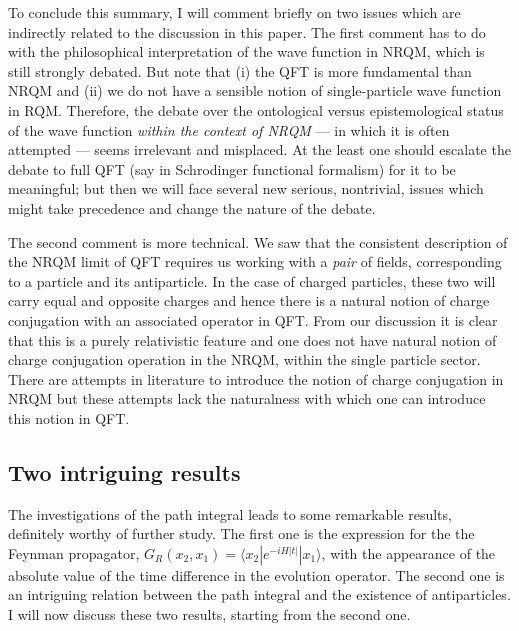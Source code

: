 \documentclass{article}
\def\bk#1#2#3{{\langle #1|#2|#3\rangle}}  %
\begin{document}
To conclude this summary, I will comment briefly on two issues which are indirectly related to the discussion in this paper. The first comment  has to do with the  philosophical interpretation of  the  wave function in NRQM, which is still strongly debated. But note that (i)
 the QFT is more fundamental than NRQM and (ii) we do not have a sensible notion of single-particle wave function in RQM. Therefore, the debate over the ontological versus epistemological
status of the wave function \textit{within the context of NRQM} --- in which it is often attempted ---
seems irrelevant and misplaced. At the least one should escalate the debate to full QFT (say in Schrodinger functional formalism) for it to be meaningful; but then we will face several new serious, nontrivial, issues which might take precedence and change the nature of the debate.

The second comment is more technical. We saw that the consistent description of the NRQM limit of QFT requires us working with a \textit{pair} of fields, corresponding to a particle and its antiparticle.  
In the case of charged particles, these two will carry equal and opposite charges and hence there is a natural notion of charge conjugation with an associated operator in QFT. From our discussion it is clear that this is a purely relativistic feature and one does not have natural notion of charge conjugation operation in the NRQM, within the single particle sector. There are attempts in literature to introduce the notion of charge conjugation in NRQM but these attempts lack the naturalness with which one can introduce this notion in QFT. 






\subsection{Two intriguing results}

The investigations of the path integral leads to some remarkable results, definitely worthy of further study. The first one is the expression for the 
the Feynman propagator, $G_R(x_2 , x_1 )=\bk{x_2}{e^{−iH|t|}}{x_1}$,  with the appearance of the absolute value of the time difference in the evolution operator. The second one is an intriguing relation between the path integral and the existence of antiparticles. I will now discuss these two results, starting from the second one.
\end{document}
